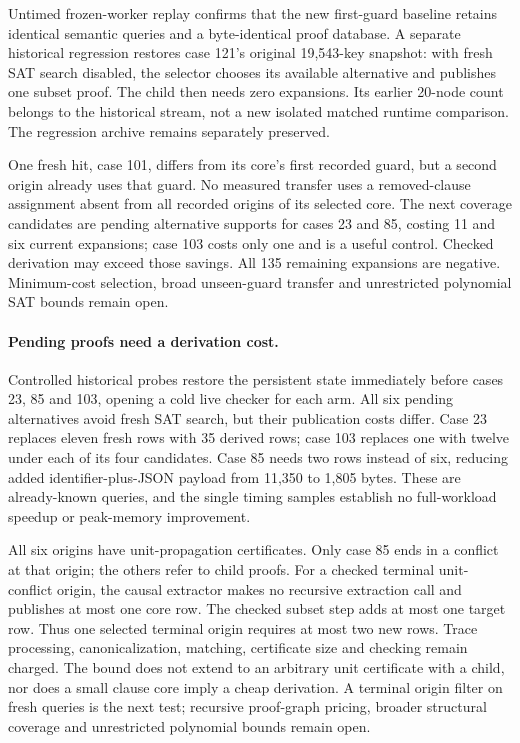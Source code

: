 \documentclass[11pt,a4paper]{article}
\numberwithin{equation}{section}
\theoremstyle{plain}
\theoremstyle{definition}
\theoremstyle{remark}
\begin{document}
Untimed frozen-worker replay confirms that the new first-guard baseline retains
identical semantic queries and a byte-identical proof database. A separate
historical regression restores case 121's original 19,543-key snapshot: with
fresh SAT search disabled, the selector chooses its available alternative and
publishes one subset proof. The child then needs zero expansions. Its earlier
20-node count belongs to the historical stream, not a new isolated matched
runtime comparison. The regression archive remains separately preserved.

One fresh hit, case 101, differs from its core's first recorded guard, but a
second origin already uses that guard. No measured transfer uses a removed-clause
assignment absent from all recorded origins of its selected core. The next
coverage candidates are pending alternative supports for cases 23 and 85, costing
11 and six current expansions; case 103 costs only one and is a useful control.
Checked derivation may exceed those savings. All 135 remaining expansions are
negative. Minimum-cost selection, broad unseen-guard transfer and unrestricted
polynomial SAT bounds remain open.

\paragraph{Pending proofs need a derivation cost.}
Controlled historical probes restore the persistent state immediately before
cases 23, 85 and 103, opening a cold live checker for each arm. All six pending
alternatives avoid fresh SAT search, but their publication costs differ.
Case 23 replaces eleven fresh rows with 35 derived rows; case 103 replaces one
with twelve under each of its four candidates. Case 85 needs two rows instead
of six, reducing added identifier-plus-JSON payload from 11,350 to 1,805 bytes.
These are already-known queries, and the single timing samples establish no
full-workload speedup or peak-memory improvement.

All six origins have unit-propagation certificates. Only case 85 ends in a
conflict at that origin; the others refer to child proofs. For a checked terminal
unit-conflict origin, the causal extractor makes no recursive extraction call
and publishes at most one core row. The checked subset step adds at most one
target row. Thus one selected terminal origin requires at most two new rows.
Trace processing, canonicalization, matching, certificate size and checking
remain charged. The bound does not extend to an arbitrary unit certificate
with a child, nor does a small clause core imply a cheap derivation. A terminal
origin filter on fresh queries is the next test; recursive proof-graph pricing,
broader structural coverage and unrestricted polynomial bounds remain open.
\end{document}
